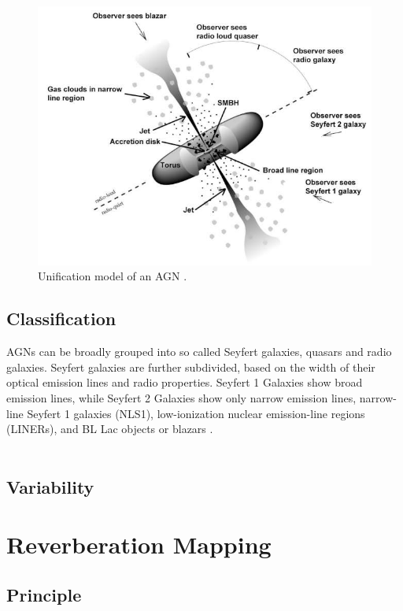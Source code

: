 \begin{figure}[!ht]
	\centering
	\includegraphics[width=\textwidth]{pictures/Chapter2/AGN_unified_model.jpg}
	\caption{Unification model of an AGN \parencite{fermi2025figure1}.}
	\label{fig:agn_sed}
\end{figure}

\subsection{Classification}

AGNs can be broadly grouped into so called Seyfert galaxies, quasars and radio galaxies. Seyfert galaxies are further subdivided, based on the width of their optical emission lines and radio properties. Seyfert 1 Galaxies show broad emission lines, while Seyfert 2 Galaxies show only narrow emission lines, narrow-line Seyfert 1 galaxies (NLS1), low-ionization nuclear emission-line regions (LINERs), and BL Lac objects or blazars \parencite{antonucci1993unified,urry1995unified}.\\\\

\subsection{Variability}

\section{Reverberation Mapping}


\subsection{Principle}


